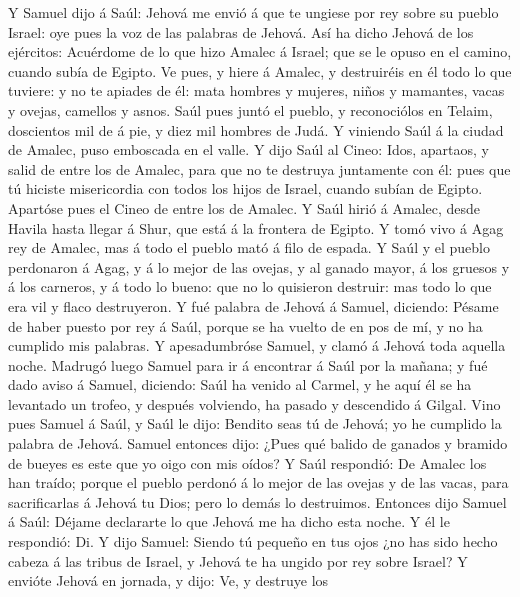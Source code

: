  Y Samuel dijo á Saúl: Jehová me envió á que te ungiese
por rey sobre su pueblo Israel: oye pues la voz de las palabras de
Jehová.  Así ha dicho Jehová de los ejércitos: Acuérdome
de lo que hizo Amalec á Israel; que se le opuso en el camino, cuando
subía de Egipto.  Ve pues, y hiere á Amalec, y destruiréis
en él todo lo que tuviere: y no te apiades de él: mata hombres y
mujeres, niños y mamantes, vacas y ovejas, camellos y asnos.
 Saúl pues juntó el pueblo, y reconociólos en Telaim,
doscientos mil de á pie, y diez mil hombres de Judá.  Y
viniendo Saúl á la ciudad de Amalec, puso emboscada en el valle.
 Y dijo Saúl al Cineo: Idos, apartaos, y salid de entre
los de Amalec, para que no te destruya juntamente con él: pues que tú
hiciste misericordia con todos los hijos de Israel, cuando subían de
Egipto. Apartóse pues el Cineo de entre los de Amalec.  Y
Saúl hirió á Amalec, desde Havila hasta llegar á Shur, que está á la
frontera de Egipto.  Y tomó vivo á Agag rey de Amalec, mas
á todo el pueblo mató á filo de espada.  Y Saúl y el
pueblo perdonaron á Agag, y á lo mejor de las ovejas, y al ganado mayor,
á los gruesos y á los carneros, y á todo lo bueno: que no lo quisieron
destruir: mas todo lo que era vil y flaco destruyeron.  Y
fué palabra de Jehová á Samuel, diciendo:  Pésame de
haber puesto por rey á Saúl, porque se ha vuelto de en pos de mí, y no
ha cumplido mis palabras. Y apesadumbróse Samuel, y clamó á Jehová toda
aquella noche.  Madrugó luego Samuel para ir á encontrar
á Saúl por la mañana; y fué dado aviso á Samuel, diciendo: Saúl ha
venido al Carmel, y he aquí él se ha levantado un trofeo, y después
volviendo, ha pasado y descendido á Gilgal.  Vino pues
Samuel á Saúl, y Saúl le dijo: Bendito seas tú de Jehová; yo he cumplido
la palabra de Jehová.  Samuel entonces dijo: ¿Pues qué
balido de ganados y bramido de bueyes es este que yo oigo con mis oídos?
 Y Saúl respondió: De Amalec los han traído; porque el
pueblo perdonó á lo mejor de las ovejas y de las vacas, para
sacrificarlas á Jehová tu Dios; pero lo demás lo destruimos.
 Entonces dijo Samuel á Saúl: Déjame declararte lo que
Jehová me ha dicho esta noche. Y él le respondió: Di.  Y
dijo Samuel: Siendo tú pequeño en tus ojos ¿no has sido hecho cabeza á
las tribus de Israel, y Jehová te ha ungido por rey sobre Israel?
 Y envióte Jehová en jornada, y dijo: Ve, y destruye los
